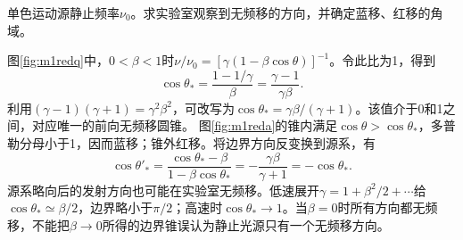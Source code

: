 \begin{exercise}\label{ex:m1redblue}
单色运动源静止频率$\nu_0$。求实验室观察到无频移的方向，并确定蓝移、红移的角域。
\end{exercise}
\begin{solution}
图\ref{fig:m1redq}中，$0<\beta<1$时$\nu/\nu_0=[\gamma(1-\beta\cos\theta)]^{-1}$。令此比为1，得到
\[
 \cos\theta_* =\frac{1-1/\gamma}{\beta}
 =\frac{\gamma-1}{\gamma\beta}.
\]
利用$(\gamma-1)(\gamma+1)=\gamma^2\beta^2$，可改写为$\cos\theta_*=\gamma\beta/(\gamma+1)$。该值介于0和1之间，对应唯一的前向无频移圆锥。
图\ref{fig:m1reda}的锥内满足$\cos\theta>\cos\theta_*$，多普勒分母小于1，因而蓝移；锥外红移。将边界方向反变换到源系，有
\[
 \cos\theta'_* =\frac{\cos\theta_*-\beta}{1-\beta\cos\theta_*}
 =-\frac{\gamma\beta}{\gamma+1}=-\cos\theta_*.
\]
源系略向后的发射方向也可能在实验室无频移。低速展开$\gamma=1+\beta^2/2+\cdots$给$\cos\theta_*\simeq\beta/2$，边界略小于$\pi/2$；高速时$\cos\theta_*\to1$。当$\beta=0$时所有方向都无频移，不能把$\beta\to0$所得的边界锥误认为静止光源只有一个无频移方向。
\end{solution}
